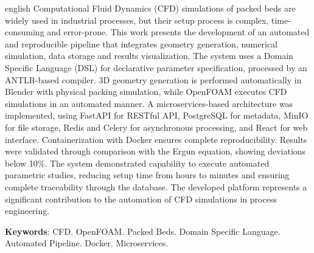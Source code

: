 \begin{resumo}[Abstract]
\begin{otherlanguage*}{english}
Computational Fluid Dynamics (CFD) simulations of packed beds are widely used in industrial processes, but their setup process is complex, time-consuming and error-prone. This work presents the development of an automated and reproducible pipeline that integrates geometry generation, numerical simulation, data storage and results visualization. The system uses a Domain Specific Language (DSL) for declarative parameter specification, processed by an ANTLR-based compiler. 3D geometry generation is performed automatically in Blender with physical packing simulation, while OpenFOAM executes CFD simulations in an automated manner. A microservices-based architecture was implemented, using FastAPI for RESTful API, PostgreSQL for metadata, MinIO for file storage, Redis and Celery for asynchronous processing, and React for web interface. Containerization with Docker ensures complete reproducibility. Results were validated through comparison with the Ergun equation, showing deviations below 10\%. The system demonstrated capability to execute automated parametric studies, reducing setup time from hours to minutes and ensuring complete traceability through the database. The developed platform represents a significant contribution to the automation of CFD simulations in process engineering.

\textbf{Keywords}: CFD. OpenFOAM. Packed Beds. Domain Specific Language. Automated Pipeline. Docker. Microservices.
\end{otherlanguage*}
\end{resumo}

